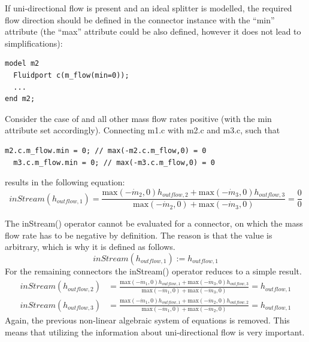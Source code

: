 \documentclass[10pt,a4paper]{report}
\begin{document}
If uni-directional flow is present and an ideal splitter is modelled,
the required flow direction should be defined in the connector instance
with the ``min'' attribute (the ``max'' attribute could be also defined,
however it does not lead to simplifications):

\begin{lstlisting}[language=modelica]
model m2
  Fluidport c(m_flow(min=0));
  ...
end m2;
\end{lstlisting}

Consider the case of and all other mass flow rates positive (with the
min attribute set accordingly). Connecting m1.c with m2.c and m3.c, such
that

\begin{lstlisting}[language=modelica]
  m2.c.m_flow.min = 0; // max(-m2.c.m_flow,0) = 0
  m3.c.m_flow.min = 0; // max(-m3.c.m_flow,0) = 0
\end{lstlisting}
results in the following equation:
\begin{equation*}
inStream(h_{outflow,1})=\frac{\text{max}(-\dot{m}_2,0)h_{outflow,2}+\text{max}(-\dot{m}_3,0)h_{outflow,3}}{\text{max}(-\dot{m}_2,0)+\text{max}(-\dot{m}_3,0)}=\frac{0}{0}
\end{equation*}

The inStream() operator cannot be evaluated for a connector, on which
the mass flow rate has to be negative by definition. The reason is that
the value is arbitrary, which is why it is defined as follows.
\begin{equation*}
inStream(h_{outflow,1}):=h_{outflow,1}
\end{equation*}
For the remaining connectors the inStream() operator reduces to a simple
result.
\begin{eqnarray*}
inStream(h_{outflow,2})&=\frac{\text{max}(-\dot{m}_1,0)h_{outflow,1}+\text{max}(-\dot{m}_3,0)h_{outflow,3}}{\text{max}(-\dot{m}_1,0)+\text{max}(-\dot{m}_3,0)}=h_{outflow,1}\\
inStream(h_{outflow,3})&=\frac{\text{max}(-\dot{m}_1,0)h_{outflow,1}+\text{max}(-\dot{m}_2,0)h_{outflow,2}}{\text{max}(-\dot{m}_1,0)+\text{max}(-\dot{m}_2,0)}=h_{outflow,1}
\end{eqnarray*}
Again, the previous non-linear algebraic system of equations is removed.
This means that utilizing the information about uni-directional flow is
very important.
\end{document}
